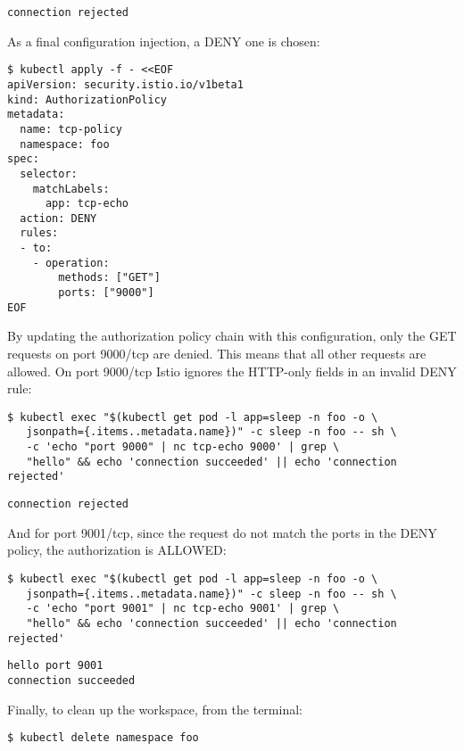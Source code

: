 \begin{lstlisting}
connection rejected
\end{lstlisting}

As a final configuration injection, a DENY one is chosen:

\begin{lstlisting}
$ kubectl apply -f - <<EOF
apiVersion: security.istio.io/v1beta1
kind: AuthorizationPolicy
metadata:
  name: tcp-policy
  namespace: foo
spec:
  selector:
    matchLabels:
      app: tcp-echo
  action: DENY
  rules:
  - to:
    - operation:
        methods: ["GET"]
        ports: ["9000"]
EOF
\end{lstlisting}

\noindent By updating the authorization policy chain with this configuration, only the GET requests on port 9000/tcp are denied. This means that all other requests are allowed. On port 9000/tcp Istio ignores the HTTP-only fields in an invalid DENY rule:

\begin{lstlisting}
$ kubectl exec "$(kubectl get pod -l app=sleep -n foo -o \
   jsonpath={.items..metadata.name})" -c sleep -n foo -- sh \ 
   -c 'echo "port 9000" | nc tcp-echo 9000' | grep \
   "hello" && echo 'connection succeeded' || echo 'connection rejected'
\end{lstlisting}

\begin{lstlisting}
connection rejected
\end{lstlisting}

\noindent And for port 9001/tcp, since the request do not match the ports in the DENY policy, the authorization is ALLOWED:

\begin{lstlisting}
$ kubectl exec "$(kubectl get pod -l app=sleep -n foo -o \
   jsonpath={.items..metadata.name})" -c sleep -n foo -- sh \ 
   -c 'echo "port 9001" | nc tcp-echo 9001' | grep \
   "hello" && echo 'connection succeeded' || echo 'connection rejected'
\end{lstlisting}

\begin{lstlisting}
hello port 9001
connection succeeded
\end{lstlisting}

Finally, to clean up the workspace, from the terminal:

\begin{lstlisting}
$ kubectl delete namespace foo
\end{lstlisting}